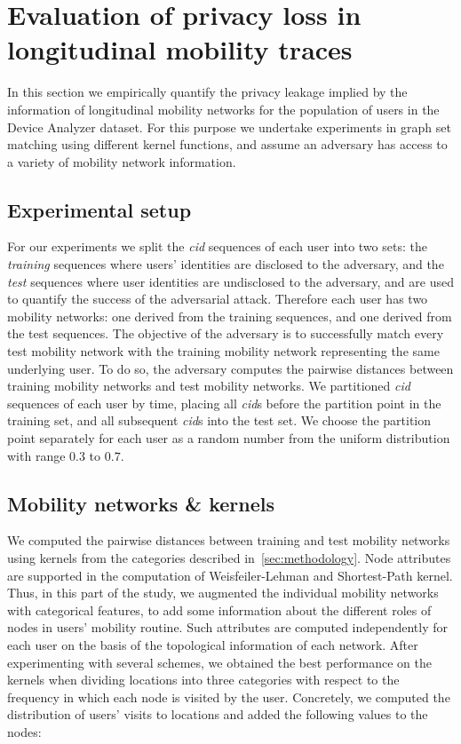 \section{Evaluation of privacy loss in longitudinal mobility traces}\label{sec:pl-evaluation}

In this section we empirically quantify the privacy leakage implied by the information of longitudinal mobility networks for the population of users in the Device Analyzer dataset.
For this purpose we undertake experiments in graph set matching using different kernel functions, and assume an adversary has access to a variety of mobility network information.

\subsection{Experimental setup}

For our experiments we split the \emph{cid} sequences of each user into two sets: the \emph{training} sequences where users' identities are disclosed to the adversary, and the \emph{test} sequences where user identities are undisclosed to the adversary, and are used to quantify the success of the adversarial attack.
Therefore each user has two mobility networks: one derived from the training sequences, and one derived from the test sequences.
The objective of the adversary is to successfully match every test mobility network with the training mobility network representing the same underlying user.
To do so, the adversary computes the pairwise distances between training mobility networks and test mobility networks.
We partitioned \emph{cid} sequences of each user by time, placing all \emph{cid}s before the partition point in the training set, and all subsequent \emph{cid}s into the test set.
We choose the partition point separately for each user as a random number from the uniform distribution with range $ 0.3 $ to $ 0.7 $.

\subsection{Mobility networks \& kernels}

We computed the pairwise distances between training and test mobility networks using kernels from the categories described in~\cref{sec:methodology}.
Node attributes are supported in the computation of Weisfeiler-Lehman and Shortest-Path kernel.
Thus, in this part of the study, we augmented the individual mobility networks with categorical features, to add some information about the different roles of nodes in users' mobility routine.
Such attributes are computed independently for each user on the basis of the topological information of each network.
After experimenting with several schemes, we obtained the best performance on the kernels when dividing locations into three categories with respect to the frequency in which each node is visited by the user.
Concretely, we computed the distribution of users' visits to locations and added the following values to the nodes:

